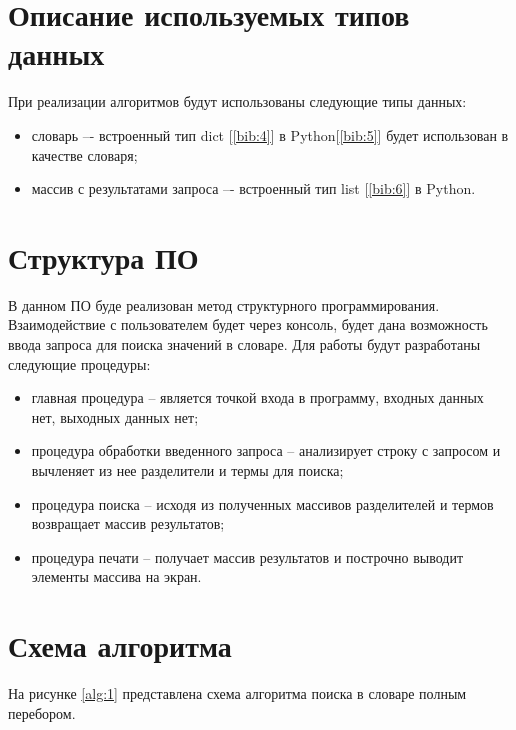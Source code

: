     \section{Описание используемых типов данных}
    \par При реализации алгоритмов будут использованы следующие типы данных:
    \begin{itemize}
        \item словарь –- встроенный тип dict [\ref{bib:4}] в Python[\ref{bib:5}] будет использован в качестве словаря;
        \item массив с результатами запроса –- встроенный тип list [\ref{bib:6}] в Python.
    \end{itemize}

    \section{Структура ПО}
    \par В данном ПО буде реализован метод структурного программирования. Взаимодействие с пользователем будет через консоль, будет дана возможность ввода запроса для поиска значений в словаре. Для работы будут разработаны следующие процедуры:

    \begin{itemize}
        \item главная процедура – является точкой входа в программу, входных данных нет, выходных данных нет;
        \item процедура обработки введенного запроса -- анализирует строку с запросом и вычленяет из нее разделители и термы для поиска;
        \item процедура поиска -- исходя из полученных массивов разделителей и термов возвращает массив результатов;
        \item процедура печати -- получает массив результатов и построчно выводит элементы массива на экран.
    \end{itemize}

    \section{Схема алгоритма}
    \par На рисунке \ref{alg:1} представлена схема алгоритма поиска в словаре полным перебором.

